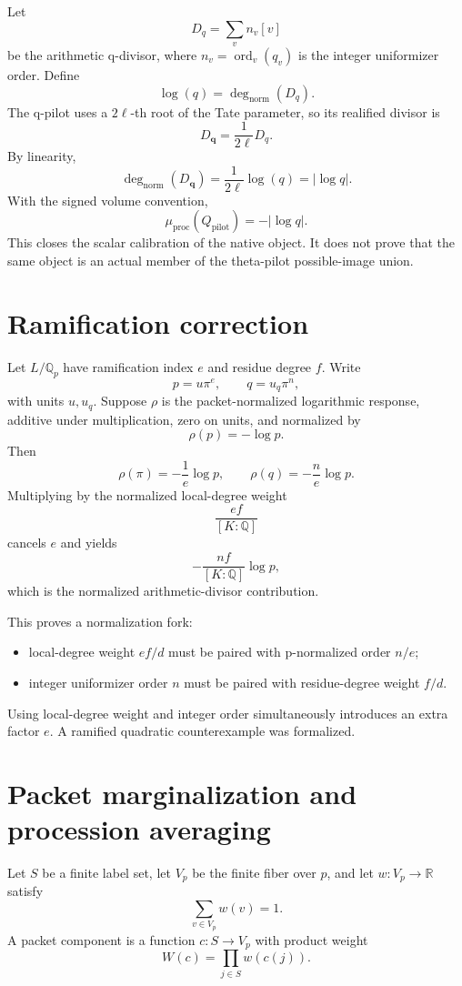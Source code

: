 \documentclass[11pt]{amsart}
\theoremstyle{definition}
\theoremstyle{remark}
\newcommand{\R}{\mathbb R}
\newcommand{\Q}{\mathbb Q}
\newcommand{\mup}{\mu_{\mathrm{proc}}}
\begin{document}
Let
\[
 D_q=\sum_v n_v[v]
\]
be the arithmetic q-divisor, where $n_v=\operatorname{ord}_v(q_v)$ is the
integer uniformizer order.  Define
\[
 \log(q)=\deg_{\mathrm{norm}}(D_q).
\]
The q-pilot uses a $2\ell$-th root of the Tate parameter, so its realified
divisor is
\[
 D_{\mathbf q}=\frac1{2\ell}D_q.
\]
By linearity,
\[
 \deg_{\mathrm{norm}}(D_{\mathbf q})
 =\frac1{2\ell}\log(q)=|\log q|.
\]
With the signed volume convention,
\[
 \boxed{\mup(Q_{\mathrm{pilot}})=-|\log q|.}
\]
This closes the scalar calibration of the native object.  It does not prove
that the same object is an actual member of the theta-pilot possible-image
union.

\section{Ramification correction}

Let $L/\Q_p$ have ramification index $e$ and residue degree $f$.  Write
\[
 p=u\pi^e,
 \qquad
 q=u_q\pi^n,
\]
with units $u,u_q$.  Suppose $\rho$ is the packet-normalized logarithmic
response, additive under multiplication, zero on units, and normalized by
\[
 \rho(p)=-\log p.
\]
Then
\[
 \rho(\pi)=-\frac1e\log p,
 \qquad
 \rho(q)=-\frac ne\log p.
\]
Multiplying by the normalized local-degree weight
\[
 \frac{ef}{[K:\Q]}
\]
cancels $e$ and yields
\[
 -\frac{nf}{[K:\Q]}\log p,
\]
which is the normalized arithmetic-divisor contribution.

This proves a normalization fork:

\begin{itemize}
\item local-degree weight $ef/d$ must be paired with p-normalized order $n/e$;
\item integer uniformizer order $n$ must be paired with residue-degree weight
$f/d$.
\end{itemize}

Using local-degree weight and integer order simultaneously introduces an
extra factor $e$.  A ramified quadratic counterexample was formalized.

\section{Packet marginalization and procession averaging}

Let $S$ be a finite label set, let $V_p$ be the finite fiber over $p$, and let
$w:V_p\to\R$ satisfy
\[
 \sum_{v\in V_p}w(v)=1.
\]
A packet component is a function $c:S\to V_p$ with product weight
\[
 W(c)=\prod_{j\in S}w(c(j)).
\]
\end{document}
